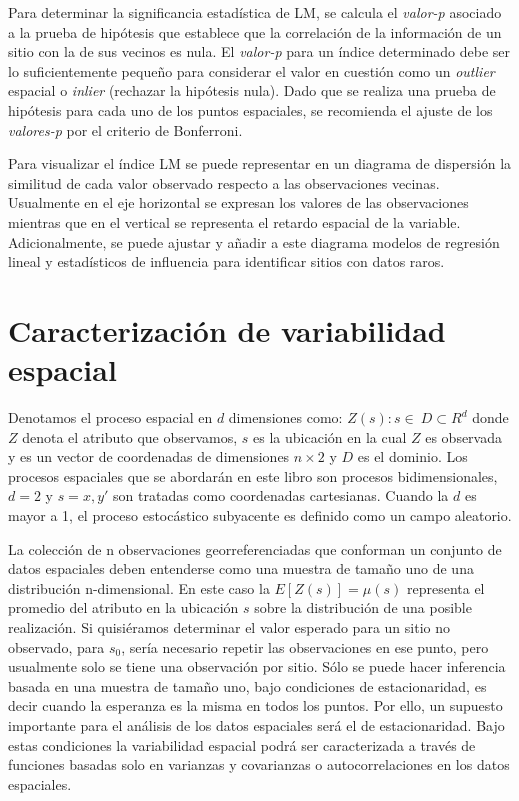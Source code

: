 \documentclass[11pt,b5paper,]{krantz}
\begin{document}
Para determinar la significancia estadística de LM, se calcula el
\emph{valor-p} asociado a la prueba de hipótesis que establece que la
correlación de la información de un sitio con la de sus vecinos es nula.
El \emph{valor-p} para un índice determinado debe ser lo suficientemente
pequeño para considerar el valor en cuestión como un \emph{outlier}
espacial o \emph{inlier} (rechazar la hipótesis nula). Dado que se
realiza una prueba de hipótesis para cada uno de los puntos espaciales,
se recomienda el ajuste de los \emph{valores-p} por el criterio de
Bonferroni.

Para visualizar el índice LM se puede representar en un diagrama de
dispersión la similitud de cada valor observado respecto a las
observaciones vecinas. Usualmente en el eje horizontal se expresan los
valores de las observaciones mientras que en el vertical se representa
el retardo espacial de la variable. Adicionalmente, se puede ajustar y
añadir a este diagrama modelos de regresión lineal y estadísticos de
influencia para identificar sitios con datos raros.

\chapter{Caracterización de variabilidad
espacial}\label{caracterizaciuxf3n-de-variabilidad-espacial}

Denotamos el proceso espacial en \(d\) dimensiones como:
\({Z(s): s\in\ D\subset R^d}\) donde \(Z\) denota el atributo que
observamos, \(s\) es la ubicación en la cual \(Z\) es observada y es un
vector de coordenadas de dimensiones \(n\times2\) y \(D\) es el dominio.
Los procesos espaciales que se abordarán en este libro son procesos
bidimensionales, \(d=2\) y \(s=x,y \prime\) son tratadas como
coordenadas cartesianas. Cuando la \(d\) es mayor a 1, el proceso
estocástico subyacente es definido como un campo aleatorio.

La colección de n observaciones georreferenciadas que conforman un
conjunto de datos espaciales deben entenderse como una muestra de tamaño
uno de una distribución n-dimensional. En este caso la
\(E\left[Z(s)\right]=\mu(s)\) representa el promedio del atributo en la
ubicación \(s\) sobre la distribución de una posible realización. Si
quisiéramos determinar el valor esperado para un sitio no observado,
para \(s_0\), sería necesario repetir las observaciones en ese punto,
pero usualmente solo se tiene una observación por sitio. Sólo se puede
hacer inferencia basada en una muestra de tamaño uno, bajo condiciones
de estacionaridad, es decir cuando la esperanza es la misma en todos los
puntos. Por ello, un supuesto importante para el análisis de los datos
espaciales será el de estacionaridad. Bajo estas condiciones la
variabilidad espacial podrá ser caracterizada a través de funciones
basadas solo en varianzas y covarianzas o autocorrelaciones en los datos
espaciales.
\end{document}

